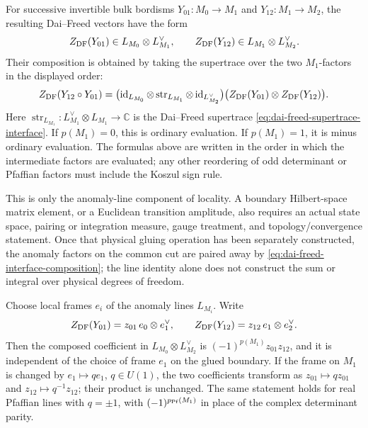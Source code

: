 For successive invertible bulk bordisms \(Y_{01}:M_0\to M_1\) and
\(Y_{12}:M_1\to M_2\), the resulting Dai--Freed vectors have the form
\[
  Z_{\rm DF}(Y_{01})\in L_{M_0}\otimes L_{M_1}^\vee,
  \qquad
  Z_{\rm DF}(Y_{12})\in L_{M_1}\otimes L_{M_2}^\vee.
\]
Their composition is obtained by taking the supertrace over the two
\(M_1\)-factors in the displayed order:
\begin{equation}
  Z_{\rm DF}(Y_{12}\circ Y_{01})
  =
  \bigl(\operatorname{id}_{L_{M_0}}
  \otimes\operatorname{str}_{L_{M_1}}
  \otimes\operatorname{id}_{L_{M_2}^\vee}\bigr)
  \bigl(Z_{\rm DF}(Y_{01})\otimes Z_{\rm DF}(Y_{12})\bigr).
  \label{eq:dai-freed-interface-composition}
\end{equation}
Here
\(\operatorname{str}_{L_{M_1}}:L_{M_1}^\vee\otimes L_{M_1}\to\mathbb C\)
is the Dai--Freed supertrace \eqref{eq:dai-freed-supertrace-interface}.  If
\(p(M_1)=0\), this is ordinary evaluation.  If \(p(M_1)=1\), it is minus
ordinary evaluation.  The formulas above are written in the order in which
the intermediate factors are evaluated; any other reordering of odd
determinant or Pfaffian factors must include the Koszul sign rule.

This is only the anomaly-line component of locality.  A boundary
Hilbert-space matrix element, or a Euclidean transition amplitude, also
requires an actual state space, pairing or integration measure, gauge
treatment, and topology/convergence statement.  Once that physical gluing
operation has been separately constructed, the anomaly factors on the common
cut are paired away by \eqref{eq:dai-freed-interface-composition}; the line
identity alone does not construct the sum or integral over physical degrees
of freedom.

\begin{proposition}
\label{prop:dai-freed-intermediate-cut-frame-cancellation}
Choose local frames \(e_i\) of the anomaly lines \(L_{M_i}\).  Write
\[
  Z_{\rm DF}(Y_{01})=z_{01}\,e_0\otimes e_1^\vee,
  \qquad
  Z_{\rm DF}(Y_{12})=z_{12}\,e_1\otimes e_2^\vee.
\]
Then the composed coefficient in
\(L_{M_0}\otimes L_{M_2}^\vee\) is
\((-1)^{p(M_1)}z_{01}z_{12}\), and it is independent of the choice of
frame \(e_1\) on the glued boundary.  If the frame on
\(M_1\) is changed by \(e_1\mapsto q e_1\), \(q\in U(1)\), the two
coefficients transform as \(z_{01}\mapsto qz_{01}\) and
\(z_{12}\mapsto q^{-1}z_{12}\); their product is unchanged.  The same statement
holds for real Pfaffian lines with \(q=\pm1\), with
\((-1)^{p_{\rm Pf}(M_1)}\) in place of the complex determinant parity.
\end{proposition}

